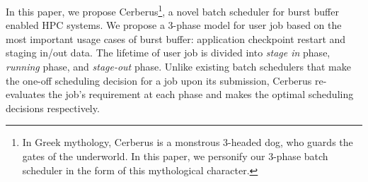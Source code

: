 In this paper, we propose Cerberus\footnote{In Greek mythology,
Cerberus is a monstrous 3-headed dog,
who guards the gates of the underworld. In this paper, we personify our 3-phase batch scheduler
in the form of this mythological character.
},
a novel batch scheduler for burst buffer enabled HPC systems. 
We propose a 3-phase model for user job 
based on the most important usage cases of burst buffer: 
application checkpoint restart and staging in/out data. 
The lifetime of user job is divided into \textit{stage in} phase, 
\textit{running} phase, and \textit{stage-out} phase. 
Unlike existing batch schedulers that 
make the one-off scheduling decision for a job upon its submission, 
Cerberus re-evaluates the job's requirement at each phase 
and makes the optimal scheduling decisions respectively.

